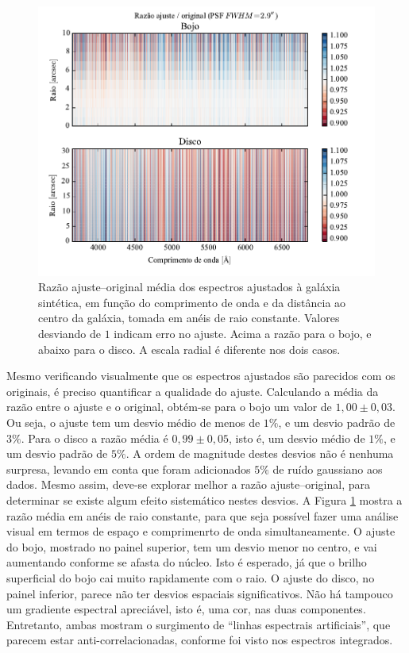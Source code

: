 \begin{figure}
	\includegraphics{figuras/simulation_error}
	\caption[Razão ajuste--original dos espectros ajustados à galáxia sintética]
	{Razão ajuste--original média dos espectros ajustados à galáxia sintética, em
	função do comprimento de onda e da distância ao centro da galáxia, tomada em
	anéis de raio constante. Valores desviando de $1$ indicam erro no ajuste.
	Acima a razão para o bojo, e abaixo para o disco. A escala radial é
	diferente nos dois casos.}
	\label{fig:testFitError}
\end{figure}

Mesmo verificando visualmente que os espectros ajustados são parecidos com os
originais, é preciso quantificar a qualidade do ajuste. Calculando a média da
razão entre o ajuste e o original, obtém-se para o bojo um valor de $1,00 \pm
0,03$. Ou seja, o ajuste tem um desvio médio de menos de $1\%$, e um desvio
padrão de $3\%$. Para o disco a razão média é $0,99 \pm 0,05$, isto é, um desvio
médio de $1\%$, e um desvio padrão de $5\%$. A ordem de magnitude destes desvios
não é nenhuma surpresa, levando em conta que foram adicionados $5\%$ de ruído
gaussiano aos dados. Mesmo assim, deve-se explorar melhor a razão
ajuste--original, para determinar se existe algum efeito sistemático nestes
desvios. A Figura \ref{fig:testFitError} mostra a razão média em anéis de raio
constante, para que seja possível fazer uma análise visual em termos de espaço e
comprimenrto de onda simultaneamente. O ajuste do bojo, mostrado no painel
superior, tem um desvio menor no centro, e vai aumentando conforme se afasta do
núcleo. Isto é esperado, já que o brilho superficial do bojo cai muito
rapidamente com o raio. O ajuste do disco, no painel inferior, parece não ter
desvios espaciais significativos.
Não há tampouco um gradiente espectral apreciável, isto é, uma cor, nas duas
componentes. Entretanto, ambas mostram o surgimento de ``linhas espectrais
artificiais'', que parecem estar anti-correlacionadas, conforme foi visto nos
espectros integrados.

